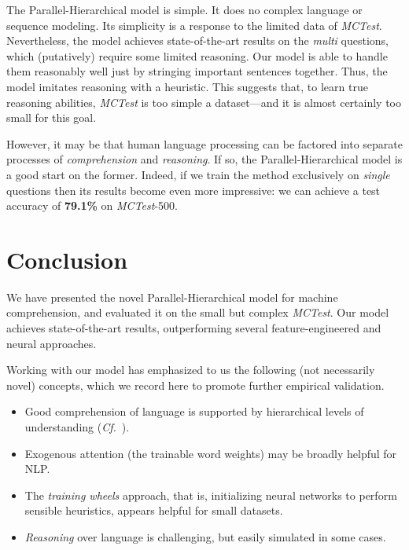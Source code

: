\documentclass[11pt]{article}
\begin{document}
The Parallel-Hierarchical model is simple. It does no complex language or sequence modeling. Its simplicity is a response to the limited data of {\it MCTest}. Nevertheless, the model achieves state-of-the-art results on the {\it multi} questions, which (putatively) require some limited reasoning. Our model is able to handle them reasonably well just by stringing important sentences together. Thus, the model imitates reasoning with a heuristic. This suggests that, to learn true reasoning abilities, {\it MCTest} is too simple a dataset---and it is almost certainly too small for this goal.

However, it may be that human language processing can be factored into separate processes of {\it comprehension} and {\it reasoning}. If so, the Parallel-Hierarchical model is a good start on the former. Indeed, if we train the method exclusively on {\it single} questions then its results become even more impressive: we can achieve a test accuracy of \textbf{79.1\%} on {\it MCTest}-500.

\section{Conclusion}
We have presented the novel Parallel-Hierarchical model for machine comprehension, and evaluated it on the small but complex {\it MCTest}. Our model achieves state-of-the-art results, outperforming several feature-engineered and neural approaches.

Working with our model has emphasized to us the following (not necessarily novel) concepts, which we record here to promote further empirical validation.
\begin{itemize}
	\item Good comprehension of language is supported by hierarchical levels of understanding ({\it Cf.}~).
	\item Exogenous attention (the trainable word weights) may be broadly helpful for NLP.
	\item The {\it training wheels} approach, that is, initializing neural networks to perform sensible heuristics, appears helpful for small datasets.
	\item {\it Reasoning} over language is challenging, but easily simulated in some cases.
\end{itemize}



\end{document}
